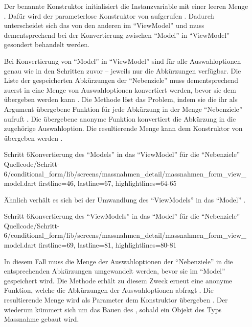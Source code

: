 Der benannte Konstruktor  initialisiert die Instanzvariable mit  einer leeren Menge .
Dafür wird der parameterlose Konstruktor von  aufgerufen .
Dadurch unterscheidet sich das  von den anderen im \enquote{ViewModel}
und muss dementsprechend bei der Konvertierung zwischen \enquote{Model} in \enquote{ViewModel} gesondert behandelt werden.

Bei Konvertierung von \enquote{Model} in \enquote{ViewModel} sind für alle Auswahloptionen -- genau wie in den Schritten zuvor -- jeweils nur die Abkürzungen verfügbar.
Die Liste der gespeicherten Abkürzungen der \enquote{Nebenziele} muss dementsprechend zuerst in eine Menge von Auswahloptionen konvertiert werden,
bevor sie dem  übergeben werden kann \Lst{\ref{lst:Schritt6setModel}}.
Die Methode  löst das Problem,
indem sie die ihr als Argument übergebene Funktion für jede Abkürzung in der Menge \enquote{Nebenziele} aufruft .
Die übergebene anonyme Funktion konvertiert die Abkürzung in die zugehörige Auswahloption.
Die resultierende Menge kann dem Konstruktor von  übergeben werden .

\begin{alexlisting}{Schritt 6}{Konvertierung des \enquote{Models} in das \enquote{ViewModel} für die \enquote{Nebenziele}}
  {Quellcode/Schritt-6/conditional_form/lib/screens/massnahmen_detail/massnahmen_form_view_model.dart}
  {firstline=46, lastline=67, highlightlines={64-65}}
  \label{lst:Schritt6setModel}
\end{alexlisting}


Ähnlich verhält es sich bei der Umwandlung des \enquote{ViewModels} in das \enquote{Model} \Lst{\ref{lst:Schritt6nebenzieleSetBuilder}}.

\begin{alexlisting}{Schritt 6}{Konvertierung des \enquote{ViewModels} in das \enquote{Model} für die \enquote{Nebenziele}}
  {Quellcode/Schritt-6/conditional_form/lib/screens/massnahmen_detail/massnahmen_form_view_model.dart}
  {firstline=69, lastline=81, highlightlines={80-81}}
  \label{lst:Schritt6nebenzieleSetBuilder}
\end{alexlisting}

In diesem Fall muss die Menge der Auswahloptionen der \enquote{Nebenziele} in die entsprechenden Abkürzungen umgewandelt werden,
bevor sie im \enquote{Model} gespeichert wird.
Die Methode  erhält zu diesem Zweck erneut eine anonyme Funktion,
welche die Abkürzungen der Auswahloptionen abfragt .
Die resultierende Menge wird als Parameter dem Konstruktor  übergeben .
Der  wiederum kümmert sich um das Bauen des , sobald ein Objekt des Typs Massnahme gebaut wird.



